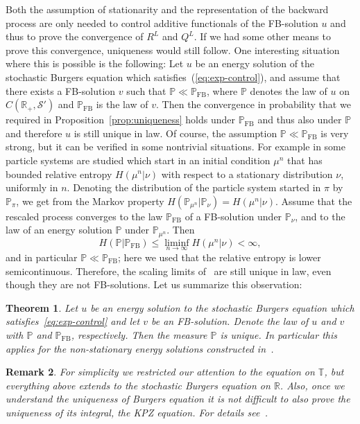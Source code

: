 \documentclass[a4paper,11pt]{article}
\newcommand{\tmop}[1]{\ensuremath{\operatorname{#1}}}
\newtheorem{theorem}{Theorem}[section]
\newtheorem{remark}[theorem]{Remark}
\newcommand{\CS}{\mathscr{S}}
\newcommand{\R}{\mathbb{R}}
\newcommand{\T}{\mathbb{T}}
\renewcommand{\P}{\mathbb{P}}
\newcommand{\1}{\mathds{1}}
\begin{document}
Both the assumption of stationarity and the representation of the backward
process are only needed to control additive functionals of the FB-solution $u$
and thus to prove the convergence of $R^L$ and $Q^L$. If we had some other
means to prove this convergence, uniqueness would still follow. One
interesting situation where this is possible is the following: Let $u$ be an
energy solution of the stochastic Burgers equation which
satisfies~(\ref{eq:exp-control}), and assume that there exists a FB-solution
$v$ such that $\mathbb{P} \ll \mathbb{P}_{\tmop{FB}}$, where $\mathbb{P}$
denotes the law of $u$ on $C (\mathbb{R}_+, \CS')$ and
$\mathbb{P}_{\tmop{FB}}$ is the law of $v$. Then the convergence in
probability that we required in Proposition~\ref{prop:uniqueness} holds under
$\mathbb{P}_{\tmop{FB}}$ and thus also under $\mathbb{P}$ and therefore $u$ is still unique in law. Of
course, the assumption $\mathbb{P} \ll \mathbb{P}_{\tmop{FB}}$ is very
strong, but it can be verified in some nontrivial situations. For example in
{\cite{GJS15}} some particle systems are studied which start in an initial
condition $\mu^n$ that has bounded relative entropy $H (\mu^n| \nu)$ with
respect to a stationary distribution $\nu$, uniformly in $n$. Denoting the
distribution of the particle system started in $\pi$ by $\mathbb{P}_{\pi}$,
we get from the Markov property $H (\mathbb{P}_{\mu^n} |\mathbb{P}_{\nu}) =
H (\mu^n | \nu)$. Assume that the rescaled process converges to the law $\mathbb{P}_{\tmop{FB}}$ of a FB-solution under $\mathbb{P}_{\nu}$, and to the law of an energy solution $\P$ under $\P_{\mu^n}$. Then
\[ H (\mathbb{P}|\mathbb{P}_{\tmop{FB}}) \leqslant \liminf_{n \rightarrow
   \infty} H (\mu^n |{\nu}) < \infty, \]
and in particular $\mathbb{P} \ll \mathbb{P}_{\tmop{FB}}$; here we used that
the relative entropy is lower semicontinuous. Therefore, the scaling limits
of~{\cite{GJS15}} are still unique in law, even though they are not
FB-solutions. Let us summarize this observation:

\begin{theorem}
   Let $u$ be an energy solution to the stochastic Burgers equation which satisfies~\eqref{eq:exp-control} and let $v$ be an FB-solution. Denote the law of $u$ and $v$ with $\P$ and $\P_{\mathrm{FB}}$, respectively. Then the measure $\P$ is unique. In particular this applies for the non-stationary energy solutions constructed in~\cite{GJS15}.
\end{theorem}

\begin{remark}
   For simplicity we restricted our attention to the equation on $\T$, but everything above extends to the stochastic Burgers equation on $\R$. Also, once we understand the uniqueness of Burgers equation it is not difficult to also prove the uniqueness of its integral, the KPZ equation. For details see~\cite{GP16}.
\end{remark}
\end{document}
